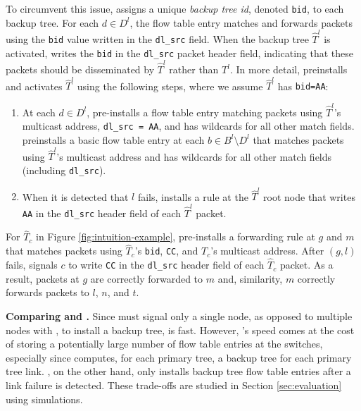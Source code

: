
To circumvent this issue, \pre assigns a unique \emph{backup tree id}, denoted {\tt bid}, to each backup tree.  For each $d \in D^l$, the flow table entry matches and forwards packets
using the {\tt bid} value written in the {\tt dl\_src} field. When the backup tree $\hat{T}^l$ is activated, \pre writes the {\tt bid} in the
{\tt dl\_src} packet header field, indicating that these packets should be disseminated by $\hat{T}^l$ rather than $T^l$.
In more detail, \pre preinstalls and activates $\hat{T}^l$ using the following steps, where we assume $\hat{T}^l$ has {\tt bid=AA}:
\begin{enumerate}
	
	\item At each $d \in D^l$, \pre pre-installs a flow table entry matching packets using $\hat{T}^l$'s multicast address, {\tt dl\_src = AA}, and has wildcards for all other match fields. 
	\pre preinstalls a basic flow table entry at each $b \in B^l \setminus D^l$ that matches packets using $\hat{T}^l$'s multicast address and has wildcards for all other match fields
	(including {\tt dl\_src}).

	\item When it is detected that $l$ fails, \pre installs a rule at the $\hat{T}^l$ root node that writes {\tt AA} in the {\tt dl\_src} header field of each $\hat{T}^l$ packet.
\end{enumerate}

For $\hat{T}_c$ in Figure \ref{fig:intuition-example}, \pre pre-installs a forwarding rule at $g$ and $m$ that matches packets using $\hat{T}_c$'s {\tt bid}, {\tt CC}, and $T_c$'s multicast 
address.  After $(g,l)$ fails, \pre signals $c$ to write {\tt CC} in the {\tt dl\_src} header field of each $\hat{T}_c$ packet.  As a result, packets at $g$ are correctly forwarded to
$m$ and, similarity, $m$ correctly forwards packets to $l$, $n$, and $t$.

{\bf Comparing \pre and \posts.}
Since \pre must signal only a single node, as opposed to multiple nodes with \posts, to install a backup tree, \pre is fast. However, \pres's speed comes at the cost of 
storing a potentially large number of flow table entries at the switches, especially since \mdr computes, for each primary tree, a backup tree for each primary tree link. \posts, on the other hand,
only installs backup tree flow table entries after a link failure is detected.
These trade-offs are studied in Section \ref{sec:evaluation} using simulations.

